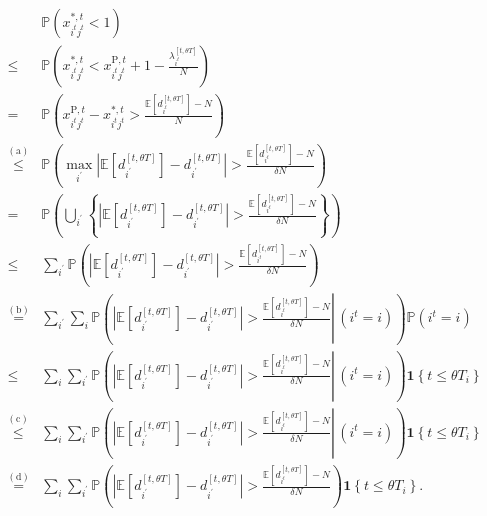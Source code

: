 $$
\begin{aligned}
& \mathbb{P}\left(x_{i^{t}j^{t}}^{*,t} <1\right) \\
\leqslant & \mathbb{P}\left(x_{i^{t}j^{t}}^{*,t} < x_{i^{t}j^{t}}^{\mathrm{P}, t}+1-\frac{\lambda_{i^t}^{[t, \theta T]}}{N}\right) \\
= & \mathbb{P}\left(x_{i^{t}j^{t}}^{\mathrm{P}, t} - x_{i^{t}j^{t}}^{*,t} > \frac{\mathbb{E}\left[d_{i^t}^{[t, \theta T]}\right]-N}{N}\right) \\
\stackrel{(\mathrm{a})}{\leqslant} & \mathbb{P}\left(\max_{i^{\prime}}\left|\mathbb{E}\left[d_{i^{\prime}}^{[t, \theta T]}\right]-d_{i^{\prime}}^{[t, \theta T]}\right|> \frac{\mathbb{E}\left[d_{i^t}^{[t, \theta T]}\right]-N}{\delta N} \right) \\
= & \mathbb{P}\left(\bigcup_{i^{\prime}}\left\{\left|\mathbb{E}\left[d_{i^{\prime}}^{[t, \theta T]}\right] - d_{i^{\prime}}^{[t, \theta T]}\right|> \frac{\mathbb{E}\left[d_{i^t}^{[t, \theta T]}\right]-N}{\delta N} \right\}\right) \\
\leqslant & \sum_{i^{\prime}} \mathbb{P}\left(\left|\mathbb{E}\left[d_{i^{\prime}}^{[t, \theta T]}\right]-d_{i^{\prime}}^{[t, \theta T]}\right|> \frac{\mathbb{E}\left[d_{i^t}^{[t, \theta T]}\right]-N}{\delta N}\right) \\
\stackrel{(\mathrm{b})}{=} & \sum_{i^{\prime}} \sum_{i} \mathbb{P}\left(\left.\left|\mathbb{E}\left[d_{i^{\prime}}^{[t, \theta T]}\right]-d_{i^{\prime}}^{[t, \theta T]}\right| > \frac{\mathbb{E}\left[d_{i^t}^{[t, \theta T]}\right]-N}{\delta N} \right\rvert\,\left(i^t = i\right) \right) \mathbb{P}\left(i^t = i \right)  \\
\leqslant & \sum_{i} \sum_{i^{\prime}} \mathbb{P}\left(\left.\left|\mathbb{E}\left[d_{i^{\prime}}^{[t, \theta T]}\right]-d_{i^{\prime}}^{[t, \theta T]}\right| > \frac{\mathbb{E}\left[d_{i^t}^{[t, \theta T]}\right]-N}{\delta N} \right\rvert\,\left(i^t = i\right) \right) \bm{1}\left\{t \leqslant \theta T_{i}\right\} \\
\stackrel{(\mathrm{c})}{\leqslant} & \sum_{i} \sum_{i^{\prime}} \mathbb{P}\left(\left.\left|\mathbb{E}\left[d_{i^{\prime}}^{[t, \theta T]}\right]-d_{i^{\prime}}^{[t, \theta T]}\right| > \frac{\mathbb{E}\left[d_{i^t}^{[t, \theta T]}\right]-N}{\delta N} \right\rvert\,\left(i^t = i\right) \right) \bm{1}\left\{t \leqslant \theta T_{i}\right\} \\
\stackrel{(\mathrm{d})}{=} & \sum_{i} \sum_{i^{\prime}} \mathbb{P}\left(\left|\mathbb{E}\left[d_{i^{\prime}}^{[t, \theta T]}\right]-d_{i^{\prime}}^{[t, \theta T]}\right| > \frac{\mathbb{E}\left[d_{i^t}^{[t, \theta T]}\right]-N}{\delta N} \right) \bm{1}\left\{t \leqslant \theta T_{i}\right\}.
\end{aligned}
$$

